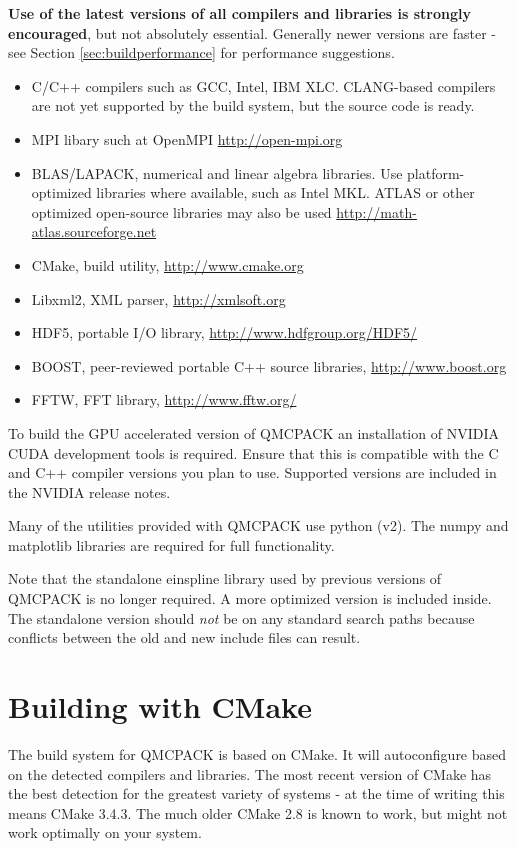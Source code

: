 \textbf{Use of the latest versions of all compilers and libraries is
strongly encouraged}, but not absolutely essential. Generally newer versions are faster - see
Section \ref{sec:buildperformance} for performance suggestions.

\begin{itemize}
\item C/C++ compilers such as GCC, Intel, IBM XLC. CLANG-based compilers
  are not yet supported by the build system, but the source code is ready.
\item MPI libary such at OpenMPI \url{http://open-mpi.org}
\item BLAS/LAPACK, numerical and linear algebra libraries. Use
  platform-optimized libraries where available, such as Intel MKL.
  ATLAS or other optimized open-source libraries may also be used
  \url{http://math-atlas.sourceforge.net}
\item CMake, build utility, \url{http://www.cmake.org}
\item Libxml2, XML parser, \url{http://xmlsoft.org}
\item HDF5, portable I/O library, \url{http://www.hdfgroup.org/HDF5/}
\item BOOST, peer-reviewed portable C++ source libraries, \url{http://www.boost.org}
\item FFTW, FFT library, \url{http://www.fftw.org/}
\end{itemize}

To build the GPU accelerated version of QMCPACK an installation of
NVIDIA CUDA development tools is required. Ensure that this is
compatible with the C and C++ compiler versions you plan to
use. Supported versions are included in the NVIDIA release notes.

Many of the utilities provided with QMCPACK use python (v2). The numpy
and matplotlib libraries are required for full functionality.

Note that the standalone einspline library used by previous versions of QMCPACK
is no longer required. A more optimized version is included
inside. The standalone version should \emph{not} be on any standard
search paths because conflicts between the old and new include files
can result.

\section{Building with CMake}
\label{sec:cmake}
The build system for QMCPACK is based on CMake.  It will autoconfigure
based on the detected compilers and libraries. The most recent
version of CMake has the best detection for the greatest variety of
systems - at the time of writing this means CMake 3.4.3. The much
older CMake 2.8 is known to work, but might not work optimally on your system.

